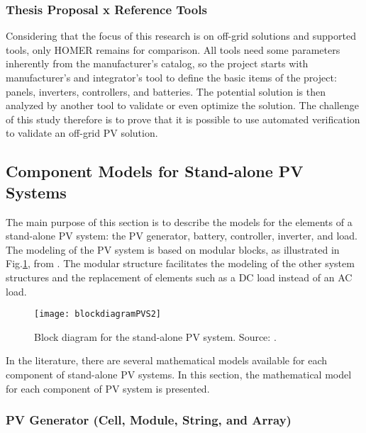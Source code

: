 \subsubsection{Thesis Proposal x Reference Tools}

Considering that the focus of this research is on off-grid solutions and supported tools, only HOMER remains for comparison. All tools need some parameters inherently from the manufacturer's catalog, so the project starts with manufacturer's and integrator's tool to define the basic items of the project: panels, inverters, controllers, and batteries. The potential solution is then analyzed by another tool to validate or even optimize the solution. The challenge of this study therefore is to prove that it is possible to use automated verification to validate an off-grid PV solution.

\subsection{Component Models for Stand-alone PV Systems}
\label{sec:model}

The main purpose of this section is to describe the models for the elements of a stand-alone PV system: the PV generator, battery, controller, inverter, and load. The modeling of the PV system is based on modular blocks, as illustrated in Fig.\ref{fig:blockdiagram}, from \cite{Hansen}. The modular structure facilitates the modeling of the other system structures and the replacement of elements such as a DC load instead of an AC load. 

\begin{figure}[h]
\texttt{[image: blockdiagramPVS2]}
\centering
\caption{Block diagram for the stand-alone PV system. Source: \cite{Hansen}.}
\label{fig:blockdiagram}
\end{figure}

In the literature, there are several mathematical models available for each component of stand-alone PV systems. In this section, the mathematical model for each component of PV system is presented. 

\subsubsection{PV Generator (Cell, Module, String, and Array) }

